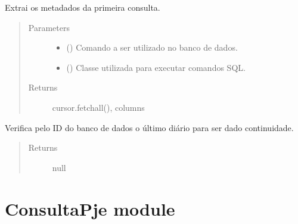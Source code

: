 \documentclass[letterpaper,10pt,english]{sphinxmanual}
\begin{document}
\begin{fulllineitems}
\label{\detokenize{ConsultaDje:ConsultaDje.consultas2}}
Extrai os metadados da primeira consulta.
\begin{quote}\begin{description}
\item[{Parameters}] \leavevmode\begin{itemize}
\item {} 
 () \textendash{} Comando a ser utilizado no banco de dados.

\item {} 
 () \textendash{} Classe utilizada para executar comandos SQL.

\end{itemize}

\item[{Returns}] \leavevmode
cursor.fetchall(), columns

\end{description}\end{quote}

\end{fulllineitems}


\begin{fulllineitems}
\label{\detokenize{ConsultaDje:ConsultaDje.verificadorDeID}}
Verifica pelo ID do banco de dados o último diário para ser dado continuidade.
\begin{quote}\begin{description}
\item[{Returns}] \leavevmode
null

\end{description}\end{quote}

\end{fulllineitems}



\section{ConsultaPje module}
\label{\detokenize{ConsultaPje:module-ConsultaPje}}\label{\detokenize{ConsultaPje:consultapje-module}}\label{\detokenize{ConsultaPje::doc}}
\end{document}

